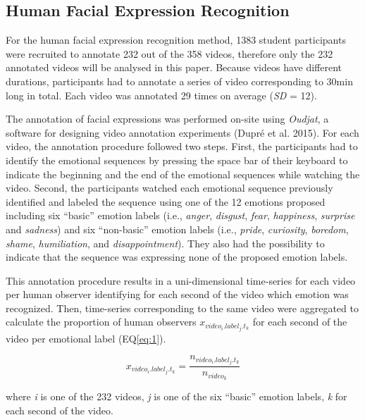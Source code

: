 \documentclass[conference,final,]{IEEEtran}
\begin{document}
\hypertarget{human-facial-expression-recognition}{%
\subsection{Human Facial Expression
Recognition}\label{human-facial-expression-recognition}}

For the human facial expression recognition method, 1383
\nolinebreak student participants were recruited to annotate 232 out of
the 358 videos, therefore only the 232 annotated videos will be analysed
in this paper. Because videos have different durations, participants had
to annotate a series of video corresponding to 30min long in total. Each
video was annotated 29 times on average (\emph{SD} = 12).

The annotation of facial expressions was performed on-site using
\emph{Oudjat}, a software for designing video annotation experiments
(Dupré et al. 2015). For each video, the annotation procedure followed
two steps. First, the participants had to identify the emotional
sequences by pressing the space bar of their keyboard to indicate the
beginning and the end of the emotional sequences while watching the
video. Second, the participants watched each emotional sequence
previously identified and labeled the sequence using one of the 12
\nolinebreak emotions proposed including six ``basic'' emotion labels
(i.e., \emph{anger}, \emph{disgust}, \emph{fear}, \emph{happiness},
\emph{surprise} and \emph{sadness}) and six ``non-basic'' emotion labels
(i.e., \emph{pride}, \emph{curiosity}, \emph{boredom}, \emph{shame},
\emph{humiliation}, and \emph{disappointment}). They also had the
possibility to indicate that the sequence was expressing none of the
proposed emotion labels.

This annotation procedure results in a uni-dimensional time-series for
each video per human observer identifying for each second of the video
which emotion was recognized. Then, time-series corresponding to the
same video were aggregated to calculate the proportion of human
observers \(x_{video_{i}.label_{j}.t_{k}}\) for each second of the video
per emotional label (EQ\ref{eq:1}).

\begin{equation}
\label{eq:1}
x_{video_{i}.label_{j}.t_{k}} = \frac{n_{video_{i}.label_{j}.t_{k}}}{n_{video_{k}}}
\end{equation}

where \emph{i} is one of the 232 videos, \emph{j} is one of the six
``basic'' emotion labels, \emph{k} for each second of the video.
\end{document}
